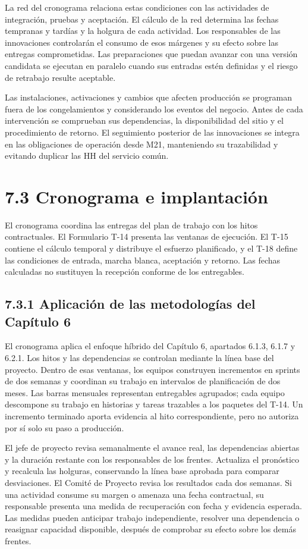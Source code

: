 \documentclass[11pt]{article}
\begin{document}
La red del cronograma relaciona estas condiciones con las actividades de integración, pruebas y aceptación. El cálculo de la red determina las fechas tempranas y tardías y la holgura de cada actividad. Los responsables de las innovaciones controlarán el consumo de esos márgenes y su efecto sobre las entregas comprometidas. Las preparaciones que puedan avanzar con una versión candidata se ejecutan en paralelo cuando sus entradas estén definidas y el riesgo de retrabajo resulte aceptable.

Las instalaciones, activaciones y cambios que afecten producción se programan fuera de los congelamientos y considerando los eventos del negocio. Antes de cada intervención se comprueban sus dependencias, la disponibilidad del sitio y el procedimiento de retorno. El seguimiento posterior de las innovaciones se integra en las obligaciones de operación desde M21, manteniendo su trazabilidad y evitando duplicar las HH del servicio común.

\section{7.3 Cronograma e implantación}\label{cronograma-e-implantaciuxf3n}

El cronograma coordina las entregas del plan de trabajo con los hitos contractuales. El Formulario T-14 presenta las ventanas de ejecución. El T-15 contiene el cálculo temporal y distribuye el esfuerzo planificado, y el T-18 define las condiciones de entrada, marcha blanca, aceptación y retorno. Las fechas calculadas no sustituyen la recepción conforme de los entregables.

\subsection{7.3.1 Aplicación de las metodologías del Capítulo 6}

El cronograma aplica el enfoque híbrido del Capítulo 6, apartados 6.1.3, 6.1.7 y 6.2.1. Los hitos y las dependencias se controlan mediante la línea base del proyecto. Dentro de esas ventanas, los equipos construyen incrementos en sprints de dos semanas y coordinan su trabajo en intervalos de planificación de dos meses. Las barras mensuales representan entregables agrupados; cada equipo descompone su trabajo en historias y tareas trazables a los paquetes del T-14. Un incremento terminado aporta evidencia al hito correspondiente, pero no autoriza por sí solo su paso a producción.

El jefe de proyecto revisa semanalmente el avance real, las dependencias abiertas y la duración restante con los responsables de los frentes. Actualiza el pronóstico y recalcula las holguras, conservando la línea base aprobada para comparar desviaciones. El Comité de Proyecto revisa los resultados cada dos semanas. Si una actividad consume su margen o amenaza una fecha contractual, su responsable presenta una medida de recuperación con fecha y evidencia esperada. Las medidas pueden anticipar trabajo independiente, resolver una dependencia o reasignar capacidad disponible, después de comprobar su efecto sobre los demás frentes.
\end{document}

